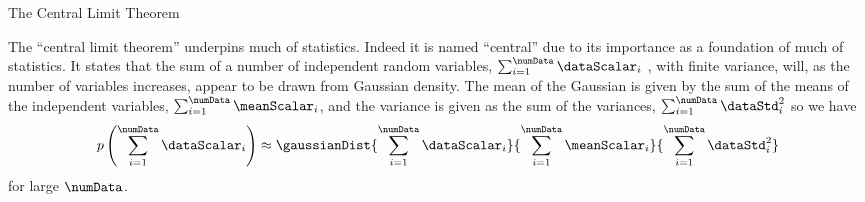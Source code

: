 \begin{boxfloat}
  \caption{The Central Limit Theorem}\label{box:central}
  \boxfontsize The ``central limit theorem'' underpins much of
  statistics. Indeed it is named ``central'' due to its importance as
  a foundation of much of statistics. It states that the sum of a
  number of independent random variables, $\sum_{i=1}^\numData
  \dataScalar_i$ , with finite variance, will, as the number of
  variables increases, appear to be drawn from Gaussian density. The
  mean of the Gaussian is given by the sum of the means of the
  independent variables, $\sum_{i=1}^\numData \meanScalar_i$, and the
  variance is given as the sum of the variances, $\sum_{i=1}^\numData
  \dataStd^2_i$ so we have
  \[
  p\left(\sum_{i=1}^\numData
      \dataScalar_i\right) \approx
  \gaussianDist{\sum_{i=1}^\numData
      \dataScalar_i}{\sum_{i=1}^\numData
      \meanScalar_i}{\sum_{i=1}^\numData
      \dataStd^2_i}
  \]
  for large $\numData$.
\end{boxfloat}
% 

